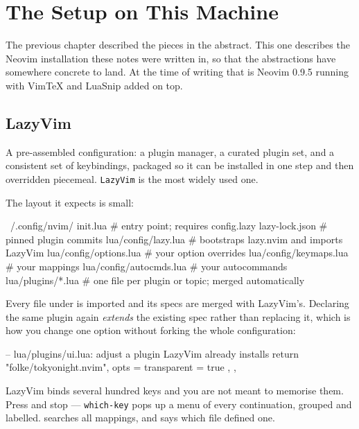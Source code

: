 \chapter{The Setup on This Machine}\label{ch:vim-setup}

The previous chapter described the pieces in the abstract. This one describes
the Neovim installation these notes were written in, so that the abstractions
have somewhere concrete to land. At the time of writing that is Neovim 0.9.5
running  with VimTeX and LuaSnip added on top.

\section{LazyVim}\label{sec:setup-lazyvim}

\begin{definition}[Distribution]
	A pre-assembled configuration: a plugin manager, a curated plugin set, and a
	consistent set of keybindings, packaged so it can be installed in one step and
	then overridden piecemeal. \texttt{LazyVim} \cite{lazyvim} is the most widely used one.
\end{definition}

The layout it expects is small:

\begin{vimcode}
~/.config/nvim/
  init.lua                 # entry point; requires config.lazy
  lazy-lock.json           # pinned plugin commits
  lua/config/lazy.lua      # bootstraps lazy.nvim and imports LazyVim
  lua/config/options.lua   # your option overrides
  lua/config/keymaps.lua   # your mappings
  lua/config/autocmds.lua  # your autocommands
  lua/plugins/*.lua        # one file per plugin or topic; merged automatically
\end{vimcode}

Every file under  is imported and its specs are merged with
LazyVim's. Declaring the same plugin again \emph{extends} the existing spec
rather than replacing it, which is how you change one option without forking
the whole configuration:

\begin{luacode}
-- lua/plugins/ui.lua: adjust a plugin LazyVim already installs
return {
  {
    "folke/tokyonight.nvim",
    opts = { transparent = true },
  },
}
\end{luacode}

\begin{note}
	LazyVim binds several hundred keys and you are not meant to memorise them.
	Press  and stop --- \texttt{which-key} pops up a menu of every
	continuation, grouped and labelled.    searches
	all mappings, and  says which file defined one.
\end{note}

